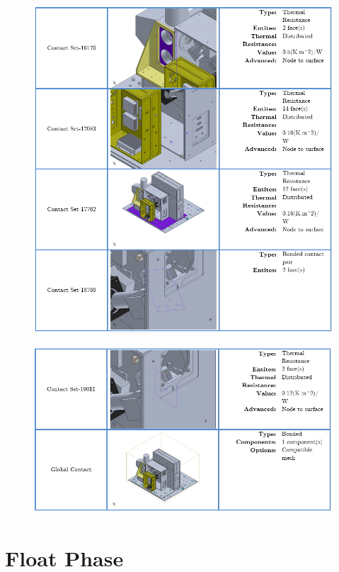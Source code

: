 \begin{figure}
    \centering
    \includegraphics[width=\textwidth]{thermal_load_images/ascent_pt2_TL_images/ascesnt_pt2_13.PNG}
\end{figure}

\begin{figure}
    \centering
    \includegraphics[width=\textwidth]{thermal_load_images/ascent_pt2_TL_images/ascesnt_pt2_14.PNG}
\end{figure}

\clearpage
\section{Float Phase}

